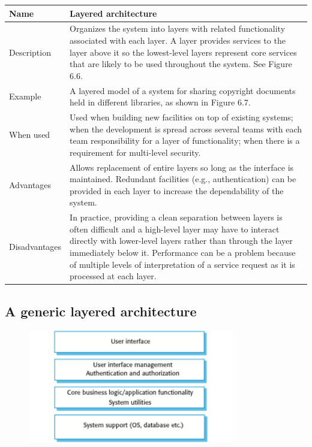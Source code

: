 \begin{table}[h!]
\centering
\begin{tabular}{ |p{3cm}|p{8cm}|  }
\hline
Name & Layered architecture\\
\hline
\hline
Description & Organizes the system into layers with related functionality associated with each layer. A layer provides services to the layer above it so the lowest-level layers represent core services that are likely to be used throughout the system. See Figure 6.6.\\
\hline
Example & A layered model of a system for sharing copyright documents held in different libraries, as shown in Figure 6.7.\\
\hline
When used & Used when building new facilities on top of existing systems; when the development is spread across several teams with each team responsibility for a layer of functionality; when there is a requirement for multi-level security.\\
\hline
Advantages & Allows replacement of entire layers so long as the interface is maintained. Redundant facilities (e.g., authentication) can be provided in each layer to increase the dependability of the system.\\
\hline
Disadvantages & In practice, providing a clean separation between layers is often difficult and a high-level layer may have to interact directly with lower-level layers rather than through the layer immediately below it. Performance can be a problem because of multiple levels of interpretation of a service request as it is processed at each layer.\\
\hline
\end{tabular}

\label{table:T2_3}
\end{table}

\newpage
\subsection{A generic layered architecture}
\begin{figure}[h!]
    \centering
    \includegraphics[width = 0.8\textwidth]{./figures/L3_4.png}
    \caption{}
    \label{fig:L3_4}
\end{figure}

